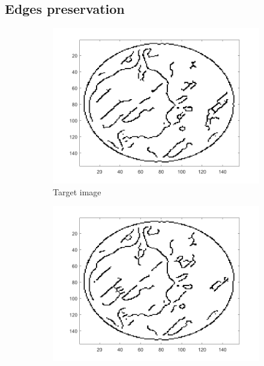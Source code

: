 \subsection{Edges preservation}


\begin{figure}[ht!]
       		\centering
      		\begin{subfigure}[b]{0.24\textwidth}
            	\centering
            	\includegraphics[width=\textwidth]{../../data/res/target1_edges.png}
            	\caption{Target image}    
        	\end{subfigure}
        	\begin{subfigure}[b]{0.24\textwidth}  
            	\centering 
            	\includegraphics[width=\textwidth]{../../data/res/SB_Reconstruction/Edges/2D/it250_proj1_2.png}

\end{subfigure}
\end{figure}

